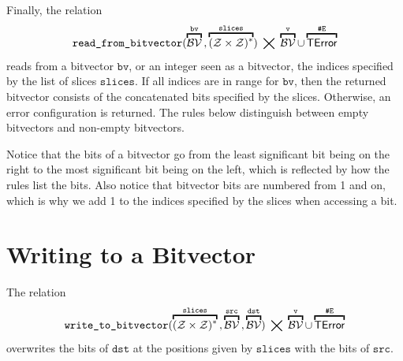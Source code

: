\documentclass{book}
\newcommand\overname[2]{\overbracket{#1}^{#2}}
\newcommand\nvbitvector[0]{\texttt{Bitvector}}
\newcommand\tint[0]{\mathcal{Z}}
\newcommand\tbitvector[0]{\mathcal{B}\mathcal{V}}
\newcommand\evalarrow[0]{\stackrel{\mathsf{asl}}{\rightsquigarrow}}
\newcommand\aslrel[0]{\bigtimes}
\newcommand\aslsep[0]{\mathbf{,}}
\newcommand\sslash[0]{\mathbin{/\mkern-6mu/}}
\newcommand\terminateas[0]{\;\sslash\;}
\newcommand\ErrorConfig[0]{\texttt{\#E}}
\newcommand\TError[0]{\textsf{TError}}
\newcommand\vv[0]{\texttt{v}}
\newcommand\vs[0]{\texttt{s}}
\newcommand\slices[0]{\texttt{slices}}
\newcommand\positions[0]{\texttt{positions}}
\newcommand\vb[0]{\texttt{b}}
\newcommand\vd[0]{\texttt{d}}
\newcommand\bv[0]{\texttt{bv}}
\newcommand\src[0]{\texttt{src}}
\newcommand\dst[0]{\texttt{dst}}
\begin{document}
Finally, the relation
\[
  \readfrombitvector(\overname{\tbitvector}{\bv} \aslsep \overname{(\tint\times\tint)^*}{\slices}) \;\aslrel\;
  \overname{\tbitvector}{\vv} \cup \overname{\TError}{\ErrorConfig}
\]
reads from a bitvector $\bv$, or an integer seen as a bitvector, the indices specified by the list of slices $\slices$.
If all indices are in range for $\bv$, then the returned bitvector consists of the concatenated bits specified
by the slices.
Otherwise, an error configuration is returned.
%
The rules below distinguish between empty bitvectors and non-empty bitvectors.
Notice that the bits of a bitvector go from the least significant bit being on the right to the most significant bit being on the left,
which is reflected by how the rules list the bits.
Also notice that bitvector bits are numbered from 1 and on, which is why we add 1 to the indices specified
by the slices when accessing a bit.

\section{Writing to a Bitvector}
The relation
\[
  \writetobitvector(\overname{(\tint\times\tint)^*}{\slices} \aslsep \overname{\tbitvector}{\src} \aslsep \overname{\tbitvector}{\dst})
  \;\bigtimes\; \overname{\tbitvector}{\vv} \cup \overname{\TError}{\ErrorConfig}
\]
overwrites the bits of $\dst$ at the positions given by $\slices$ with the bits of $\src$.

\end{document}
